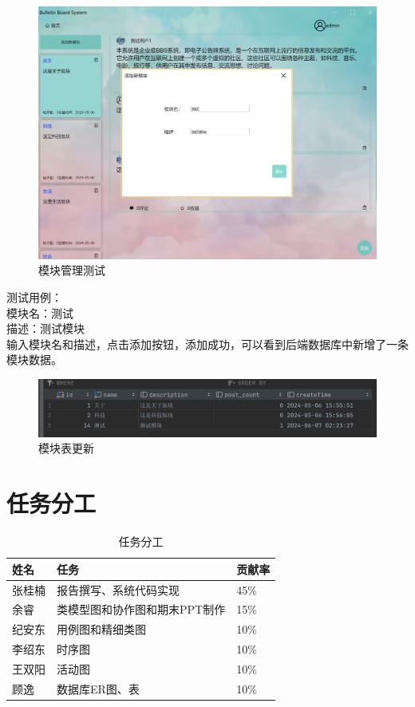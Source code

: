 \documentclass[UTF8]{ctexart}
\begin{document}
\begin{figure}[H]
  \centering
  \includegraphics[scale=0.3]{测试/添加模块.png}
  \caption{模块管理测试}
\end{figure}

测试用例：\\
模块名：测试\\
描述：测试模块\\

输入模块名和描述，点击添加按钮，添加成功，可以看到后端数据库中新增了一条模块数据。

\begin{figure}[H]
  \centering
  \includegraphics[scale=0.3]{测试/模块表更新.png}
  \caption{模块表更新}
\end{figure}





\newpage
\section{任务分工}

\begin{table}[H]
  \centering
  \begin{tabular}{|l|l|l|}
  \hline
      姓名 & 任务 & 贡献率\\ \hline
      张桂楠 & 报告撰写、系统代码实现 & 45\% \\ \hline
      余睿 & 类模型图和协作图和期末PPT制作   & 15\% \\ \hline
      纪安东 & 用例图和精细类图      & 10\%\\ \hline
      李绍东 & 时序图& 10\% \\ \hline
      王双阳 & 活动图 & 10\% \\ \hline
      顾逸 & 数据库ER图、表 & 10\% \\ \hline
  \end{tabular}
  \caption{任务分工}
\end{table}
\end{document}
